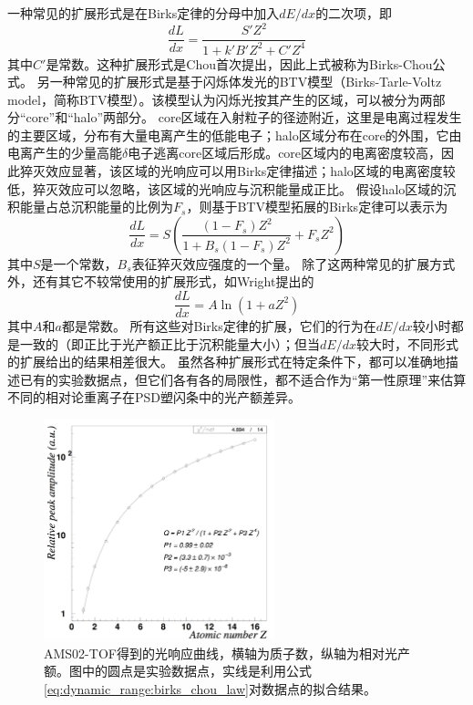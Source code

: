 一种常见的扩展形式是在Birks定律的分母中加入$dE/dx$的二次项，即
\begin{equation}
	\frac{dL}{dx} = \frac{S' Z^2}{1+k'B'Z^2+C'Z^4}
	\label{eq:dynamic_range:birks_chou_law}
\end{equation}
其中$C'$是常数。这种扩展形式是Chou首次提出\cite{chou_nature_1952}，因此上式被称为Birks-Chou公式。
另一种常见的扩展形式是基于闪烁体发光的BTV模型\cite{voltz_influence_1966,tarle_cosmic_1979}（Birks-Tarle-Voltz model，简称BTV模型）。该模型认为闪烁光按其产生的区域，可以被分为两部分“core”和“halo”两部分。
core区域在入射粒子的径迹附近，这里是电离过程发生的主要区域，分布有大量电离产生的低能电子；halo区域分布在core的外围，它由电离产生的少量高能$\delta$电子逃离core区域后形成。core区域内的电离密度较高，因此猝灭效应显著，该区域的光响应可以用Birks定律描述；halo区域的电离密度较低，猝灭效应可以忽略，该区域的光响应与沉积能量成正比。
假设halo区域的沉积能量占总沉积能量的比例为$F_s$，则基于BTV模型拓展的Birks定律可以表示为
\begin{equation}
	\frac{dL}{dx} = S(\frac{(1-F_s)Z^2}{1+B_s(1-F_s)Z^2}+F_sZ^2)
	\label{eq:dynamic_range:btv_law}
\end{equation}
其中$S$是一个常数，$B_s$表征猝灭效应强度的一个量。
除了这两种常见的扩展方式外，还有其它不较常使用的扩展形式，如Wright提出的\cite{wright_scintillation_1953}
\begin{equation}
	\frac{dL}{dx} = A \ln(1+aZ^2)
	\label{eq:dynamic_range:wright_law}
\end{equation}
其中$A$和$a$都是常数。
所有这些对Birks定律的扩展，它们的行为在$dE/dx$较小时都是一致的（即正比于光产额正比于沉积能量大小）；但当$dE/dx$较大时，不同形式的扩展给出的结果相差很大。
虽然各种扩展形式在特定条件下，都可以准确地描述已有的实验数据点，但它们各有各的局限性，都不适合作为“第一性原理”来估算不同的相对论重离子在PSD塑闪条中的光产额差异。

\begin{figure}[htbp]
	\centering
	\includegraphics[width=0.6\textwidth]{chap/dynamic_range/fig/ams02_tof.png}
	\caption{AMS02-TOF得到的光响应曲线，横轴为质子数，纵轴为相对光产额。图中的圆点是实验数据点，实线是利用公式\ref{eq:dynamic_range:birks_chou_law}对数据点的拟合结果。}
	\label{fig:dynamic_range:AMS02}
\end{figure}

